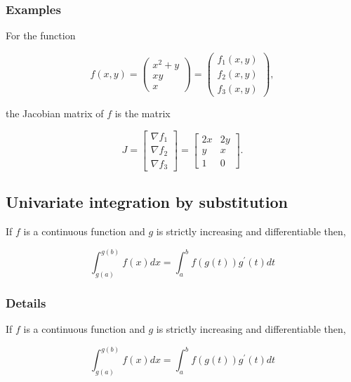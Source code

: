 \documentclass[12pt,a4paper]{article}
\theoremstyle{regla}
\theoremstyle{remark}
\theoremstyle{definition}
\theoremstyle{nonumberbreak}
\begin{document}
\subsubsection{Examples}
\begin{xmpl}

For the function 

$$f(x,y)=\begin{pmatrix}
  x^2 +y \\
  x y  \\
  x 
\end{pmatrix}=
\begin{pmatrix}
  f_1(x,y) \\
  f_2(x,y) \\
  f_3(x,y) 
\end{pmatrix},$$

the Jacobian matrix of $f$ is the matrix

$$J= \begin{bmatrix}
      \nabla f_1 \\
      \nabla f_2 \\
      \nabla f_3 
      \end{bmatrix}=
\begin{bmatrix}
      2x & 2y \\
      y & x \\
      1 & 0 
      \end{bmatrix}.
$$
\end{xmpl}

\subsection{Univariate integration by substitution}
\begin{fbox}
\begin{minipage}{0.97\textwidth}
If $f$ is a continuous function and $g$ is strictly increasing and differentiable then,


$$ \int_{g(a)}^{g(b)} f(x)dx =  \int_a^b f(g(t))g^\prime (t)dt$$


\end{minipage}
\end{fbox}
\subsubsection{Details}
If $f$ is a continuous function and $g$ is strictly increasing and differentiable then,


$$ \int_{g(a)}^{g(b)} f(x)dx =  \int_a^b f(g(t))g^\prime (t)dt$$
\end{document}
